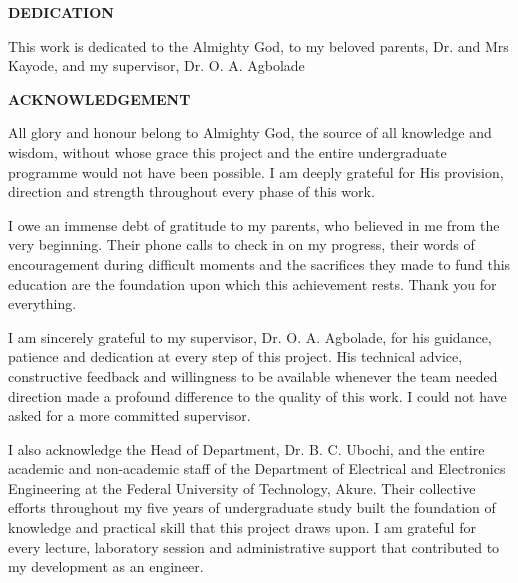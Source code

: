 \documentclass[12pt, a4paper]{report}
\begin{document}
\newpage
\setcounter{page}{3}
\thispagestyle{plain}

\begin{center}
  {\fontsize{14}{16}\bfseries DEDICATION}
\end{center}

\vspace{10pt}

This work is dedicated to  the Almighty God, to my beloved parents, Dr. and Mrs Kayode, and my supervisor, Dr. O. A. Agbolade

\newpage
\setcounter{page}{4}
\thispagestyle{plain}

\begin{center}
  {\fontsize{14}{16}\bfseries ACKNOWLEDGEMENT}
\end{center}

\vspace{10pt}

All glory and honour belong to Almighty God, the source of all knowledge
and wisdom, without whose grace this project and the entire undergraduate
programme would not have been possible. I am deeply grateful for His
provision, direction and strength throughout every phase of this work.

I owe an immense debt of gratitude to my parents, who believed in me from
the very beginning. Their phone calls to check in on my progress, their
words of encouragement during difficult moments and the sacrifices they
made to fund this education are the foundation upon which this
achievement rests. Thank you for everything.

I am sincerely grateful to my supervisor, Dr. O. A. Agbolade, for his
guidance, patience and dedication at every step of this project. His
technical advice, constructive feedback and willingness to be available
whenever the team needed direction made a profound difference to the
quality of this work. I could not have asked for a more committed
supervisor.

I also acknowledge the Head of Department, Dr. B. C. Ubochi, and the
entire academic and non-academic staff of the Department of Electrical
and Electronics Engineering at the Federal University of Technology,
Akure. Their collective efforts throughout my five years of undergraduate
study built the foundation of knowledge and practical skill that this
project draws upon. I am grateful for every lecture, laboratory session
and administrative support that contributed to my development as an
engineer.
\end{document}
